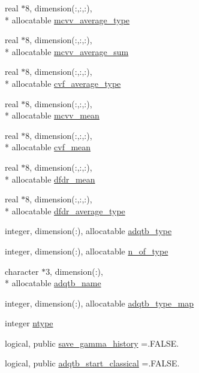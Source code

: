 \begin{DoxyCompactItemize}
\item 
real $\ast$8, dimension(\-:,\-:,\-:), \\*
allocatable \hyperlink{classqtb_a30c387f210847d0817a3db9f94a2f80d}{mcvv\-\_\-average\-\_\-type}
\item 
real $\ast$8, dimension(\-:,\-:,\-:), \\*
allocatable \hyperlink{classqtb_a476677a09383c56bbe3028b6dab3eea7}{mcvv\-\_\-average\-\_\-sum}
\item 
real $\ast$8, dimension(\-:,\-:,\-:), \\*
allocatable \hyperlink{classqtb_a036c37b3c6b63524318c5965fa33c003}{cvf\-\_\-average\-\_\-type}
\item 
real $\ast$8, dimension(\-:,\-:,\-:), \\*
allocatable \hyperlink{classqtb_ae65a01ddbd5ca81d368d7150200b4a51}{mcvv\-\_\-mean}
\item 
real $\ast$8, dimension(\-:,\-:,\-:), \\*
allocatable \hyperlink{classqtb_a46ac722f370f3b929e706228051801f4}{cvf\-\_\-mean}
\item 
real $\ast$8, dimension(\-:,\-:,\-:), \\*
allocatable \hyperlink{classqtb_a4f973bc50caab8bd82ffbe4acb07dca9}{dfdr\-\_\-mean}
\item 
real $\ast$8, dimension(\-:,\-:,\-:), \\*
allocatable \hyperlink{classqtb_a56c736b040cf072d7ec1e444bf685fb1}{dfdr\-\_\-average\-\_\-type}
\item 
integer, dimension(\-:), allocatable \hyperlink{classqtb_aa9083781ffe9503478089cd26645b88d}{adqtb\-\_\-type}
\item 
integer, dimension(\-:), allocatable \hyperlink{classqtb_a381e32b5b6088fc1c209199abedc5129}{n\-\_\-of\-\_\-type}
\item 
character $\ast$3, dimension(\-:), \\*
allocatable \hyperlink{classqtb_a1a0c930c48a8f13fbff54e36894caa9c}{adqtb\-\_\-name}
\item 
integer, dimension(\-:), allocatable \hyperlink{classqtb_a1080eac758b439ed2aeaf49ef5e92f5e}{adqtb\-\_\-type\-\_\-map}
\item 
integer \hyperlink{classqtb_a21744b9331333113a6c7a3f401c67047}{ntype}
\item 
logical, public \hyperlink{classqtb_a691e4a6864b758a6e2cba49e0dbf2088}{save\-\_\-gamma\-\_\-history} =.F\-A\-L\-S\-E.
\item 
logical, public \hyperlink{classqtb_a34e96ac736106bc3f7d5bd460e293bc8}{adqtb\-\_\-start\-\_\-classical} =.F\-A\-L\-S\-E.

\end{DoxyCompactItemize}
